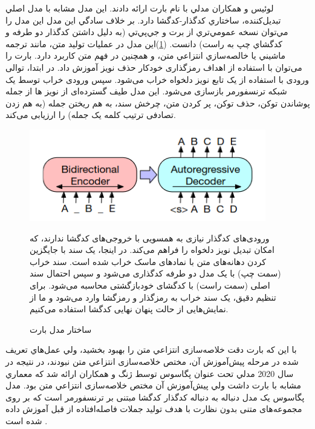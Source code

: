 لوئيس و همكاران مدلي با نام بارت 
ارائه دادند. اين مدل مشابه با مدل اصلي تبديل‌كننده، ساختاري كدگذار-كدگشا دارد. بر خلاف سادگي اين مدل اين مدل را مي‌توان نسخه عمومي‌تري از برت و جي‌پي‌تي 
(به دليل داشتن كدگذار دو طرفه و كدگشاي چپ به راست) دانست. (\ref{fig:bart})اين مدل در عمليات توليد متن، مانند ترجمه ماشيني يا خالصه‌سازي انتزاعي متن، و همچنين در فهم متن كاربرد دارد. بارت را می‌توان با استفاده از اهداف رمزگذاری خودکار حذف نویز آموزش داد. در ابتدا، توالی ورودی با استفاده از یک تابع نویز دلخواه خراب می‌شود. سپس ورودی خراب توسط یک شبکه ترنسفورمر بازسازی می‌شود. این مدل طیف گسترده‌ای از نویز ‌ها از جمله پوشاندن توکن، حذف توکن، پر کردن متن، چرخش سند، به هم ریختن جمله (به هم زدن تصادفی ترتیب کلمه یک جمله) را ارزیابی می‌کند\cite{liu2020survey,lewis-etal-2020-bart}. 
\begin{figure}[!h]
	\begin{center}
		\includegraphics[height=4cm]{bart.png}
	\end{center}
	\caption{ ساختار مدل بارت \cite{lewis-etal-2020-bart}}
	\label{fig:bart}
	\medskip
	\small
	ورودی‌های کدگذار نیازی به همسویی با خروجی‌های کدگشا ندارند، که امکان تبدیل نویز دلخواه را فراهم می‌کند. در اینجا، یک سند با جایگزین کردن دهانه‌های متن با نمادهای ماسک خراب شده است. سند خراب (سمت چپ) با یک مدل دو طرفه کدگذاری می‌شود و سپس احتمال سند اصلی (سمت راست) با کدگشای خودبازگشتی محاسبه می‌شود. برای تنظیم دقیق، یک سند خراب به رمزگذار و رمزگشا وارد می‌شود و ما از نمایش‌هایی از حالت پنهان‌ نهایی کدگشا استفاده می‌کنیم\cite{lewis-etal-2020-bart}.
\end{figure}


با اين كه بارت دقت خلاصه‌سازی انتزاعي متن را بهبود بخشيد، ولي عمل‌هاي تعریف شده در مرحله پيش‌آموزش آن، مختص خلاصه‌سازی انتزاعي متن نبودند، در نتیجه در سال 2020 مدلي تحت عنوان پگاسوس 
توسط ژنگ و همكاران ارائه شد كه معماري مشابه با بارت داشت ولي پيش‌آموزش آن مختص خلاصه‌سازی انتزاعي متن بود.
مدل پگاسوس
یک مدل دنباله به دنباله کدگذار کدگشا مبتنی بر ترنسفورمر است که بر روی مجموعه‌های متنی بدون نظارت با هدف تولید جملات فاصله‌افتاده
از قبل آموزش داده شده است
\cite{zhang2020pegasus}.

